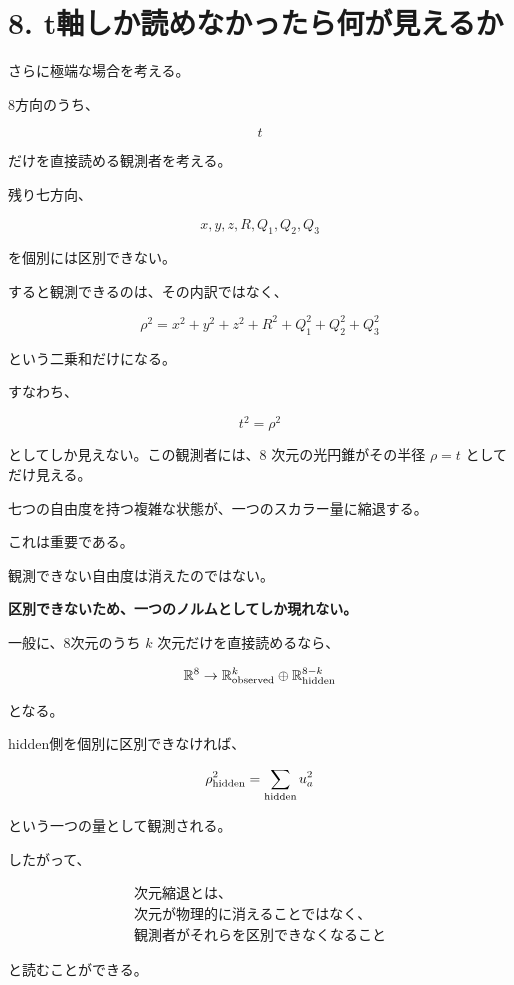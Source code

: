 \documentclass[
  a4paper,
]{ltjsarticle}
\begin{document}
\section{8.
t軸しか読めなかったら何が見えるか}\label{tux8ef8ux3057ux304bux8aadux3081ux306aux304bux3063ux305fux3089ux4f55ux304cux898bux3048ux308bux304b}

さらに極端な場合を考える。

8方向のうち、

\[
t
\]

だけを直接読める観測者を考える。

残り七方向、

\[
x,y,z,R,Q_1,Q_2,Q_3
\]

を個別には区別できない。

すると観測できるのは、その内訳ではなく、

\[
\boxed{
\rho^2=
x^2+y^2+z^2
+R^2
+Q_1^2+Q_2^2+Q_3^2
}
\]

という二乗和だけになる。

すなわち、

\[
\boxed{
t^2=\rho^2
}
\]

としてしか見えない。この観測者には、8 次元の光円錐がその半径 \(\rho=t\)
としてだけ見える。

七つの自由度を持つ複雑な状態が、一つのスカラー量に縮退する。

これは重要である。

観測できない自由度は消えたのではない。

\textbf{区別できないため、一つのノルムとしてしか現れない。}

一般に、8次元のうち \(k\) 次元だけを直接読めるなら、

\[
\mathbb R^8
\rightarrow
\mathbb R^k_{\rm observed}
\oplus
\mathbb R^{8-k}_{\rm hidden}
\]

となる。

hidden側を個別に区別できなければ、

\[
\rho_{\rm hidden}^2
=
\sum_{\rm hidden}u_a^2
\]

という一つの量として観測される。

したがって、

\[
\boxed{
\begin{array}{c}
\text{次元縮退とは、}\\
\text{次元が物理的に消えることではなく、}\\
\text{観測者がそれらを区別できなくなること}
\end{array}
}
\]

と読むことができる。
\end{document}
